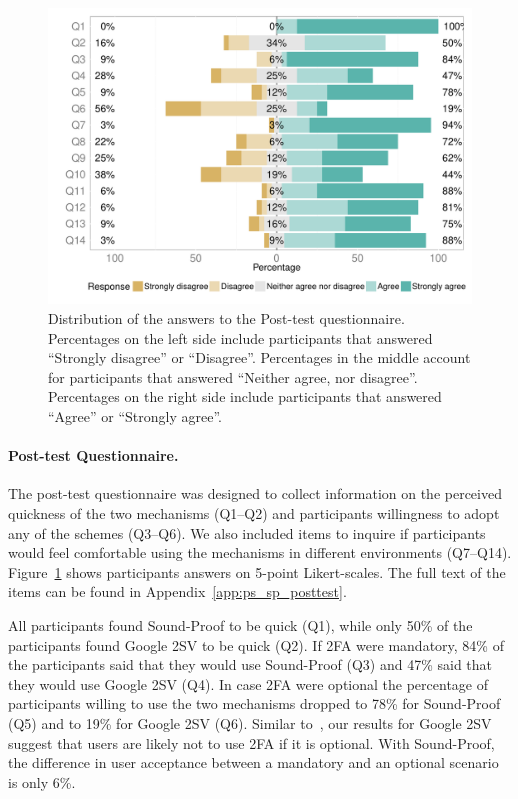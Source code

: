 \begin{figure}[!t]
    \centering
    \includegraphics[width=.8\linewidth]{figures/phonesecures/sound-proof_post}
    \caption[Distribution of the answers to the Post-test questionnaire]{Distribution of
    the answers to the Post-test questionnaire. Percentages on the left side include
    participants that answered ``Strongly disagree'' or ``Disagree''. Percentages in the
    middle account for participants that answered ``Neither agree, nor disagree''.
    Percentages on the right side include participants that answered ``Agree'' or
    ``Strongly agree''.}
    \label{fig:ps_sp_post}
\end{figure}

\paragraph{Post-test Questionnaire.}
The post-test questionnaire was designed to collect information on the perceived quickness of the two mechanisms (Q1--Q2)
and participants willingness to adopt any of the schemes (Q3--Q6).
We also included items to inquire if participants would feel comfortable using the mechanisms in different environments (Q7--Q14).
Figure~\ref{fig:ps_sp_post} shows participants answers on 5-point Likert-scales.
The full text of the items can be found in Appendix~\ref{app:ps_sp_posttest}.

All participants found Sound-Proof to be quick (Q1), while only 50\% of the participants found Google 2SV to be quick (Q2).
If 2FA were mandatory, 84\% of the participants said that they would use Sound-Proof (Q3) and 47\% said that they would use Google 2SV (Q4).
In case 2FA were optional the percentage of participants willing to use the two mechanisms dropped to 78\% for Sound-Proof (Q5) and to 19\% for Google 2SV (Q6).
Similar to~\cite{petsas15eurosec,imperi13umsurvey}, our results for Google 2SV suggest that users are likely not to use 2FA if it is optional.
With Sound-Proof, the difference in user acceptance between a mandatory and an optional scenario is only 6\%.

